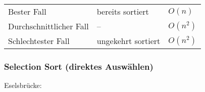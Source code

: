\begin{table}[h!]
	\centering
	\begin{tabular}{l l l}
		Bester Fall
			& bereits sortiert
			& $O(n)$ \\
		Durchschnittlicher Fall	
			& -- 
			& $O(n^2)$ \\
		Schlechtester Fall	
			& ungekehrt sortiert
			& $O(n^2)$ \\
	\end{tabular}
\end{table}




\subsubsection{Selection Sort (direktes Auswählen)}
Eselsbrücke:
